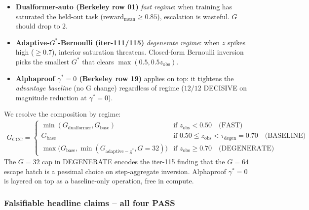 \documentclass{article}
\begin{document}
\begin{itemize}
\item \textbf{Dualformer-auto (Berkeley row 01)} \emph{fast regime}: when
  training has saturated the held-out task ($\mathrm{reward}_{\mathrm{mean}}
  \geq 0.85$), escalation is wasteful. $G$ should drop to $2$.
\item \textbf{Adaptive-$G^*$-Bernoulli (iter-111/115)} \emph{degenerate regime}:
  when $z$ spikes high ($\geq 0.7$), interior saturation threatens.
  Closed-form Bernoulli inversion picks the smallest $G^*$ that clears
  $\max(0.5, 0.5 z_{\mathrm{obs}})$.
\item \textbf{Alphaproof $\gamma^*=0$ (Berkeley row 19)} applies on top:
  it tightens the \emph{advantage baseline} (no G change)
  regardless of regime ($12/12$ DECISIVE on magnitude reduction at
  $\gamma^*=0$).
\end{itemize}

We resolve the composition by regime:
\begin{align}
G_{\mathrm{CCC}} =
  \begin{cases}
    \min(G_{\mathrm{dualformer}}, G_{\mathrm{base}}) & \text{if } z_{\mathrm{obs}} < 0.50 \quad \text{(FAST)} \\
    G_{\mathrm{base}} & \text{if } 0.50 \leq z_{\mathrm{obs}} < \tau_{\mathrm{degen}}=0.70 \quad \text{(BASELINE)} \\
    \max\!\bigl(G_{\mathrm{base}}, \min(G_{\mathrm{adaptive-g^*}}, G=32)\bigr) & \text{if } z_{\mathrm{obs}} \geq 0.70 \quad \text{(DEGENERATE)}
  \end{cases}
\end{align}
The $G=32$ cap in DEGENERATE encodes the iter-115 finding that the
$G=64$ escape hatch is a pessimal choice on step-aggregate inversion.
Alphaproof $\gamma^*=0$ is layered on top as a baseline-only operation,
free in compute.

\subsubsection*{Falsifiable headline claims -- all four PASS}
\end{document}
